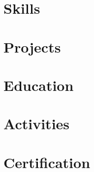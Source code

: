 \documentclass[a4paper,10pt]{article}
\begin{document}
\section{Skills}


\section{Projects}


\section{Education}


\section{Activities}


\section{Certification}
 
\end{document}
